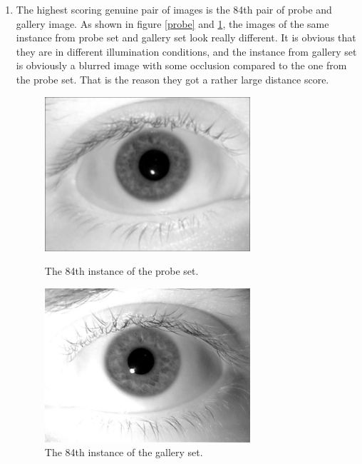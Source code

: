 \documentclass[a4paper]{article}
\begin{document}
\begin{spacing}{2.0}
\begin{enumerate}
	\item The highest scoring genuine pair of images is the 84th pair of probe and gallery image. As shown in figure \ref{probe} and \ref{gallery}, the images of the same instance from probe set and gallery set look really different. It is obvious that they are in different illumination conditions, and the instance from gallery set is obviously a blurred image with some occlusion compared to the one from the probe set. That is the reason they got a rather large distance score.
	\begin{figure}[H]
	\begin{minipage}[t]{0.5\linewidth}
	\centering
	\includegraphics[width = 3in]{probe84filtered.jpg}
	\caption{The 84th instance of the probe set.}
	\label{probe}
	\end{minipage}
	\begin{minipage}[t]{0.5\linewidth}
	\centering
	\includegraphics[width = 3in]{gallery84.jpg}
	\caption{The 84th instance of the gallery set.}
	\label{gallery}
	\end{minipage}
	\end{figure}
	

\end{enumerate}
\end{spacing}
\end{document}
